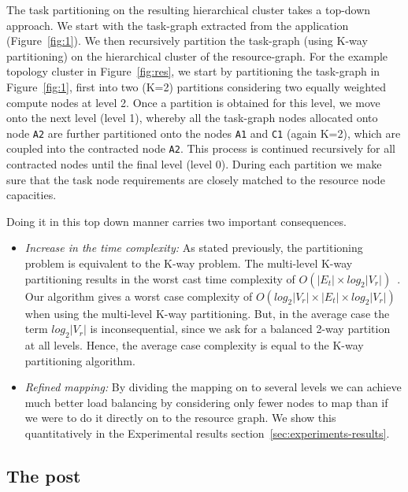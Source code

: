 The task partitioning on the resulting hierarchical cluster takes a
top-down approach. We start with the task-graph extracted from the
application (Figure~\ref{fig:1}). We then recursively partition the
task-graph (using K-way partitioning) on the hierarchical cluster of the
resource-graph. For the example topology cluster in
Figure~\ref{fig:res}, we start by partitioning the task-graph in
Figure~\ref{fig:1}, first into two (K=2) partitions considering two
equally weighted compute nodes at level 2. Once a partition is obtained
for this level, we move onto the next level (level 1), whereby all the
task-graph nodes allocated onto node \texttt{A2} are further partitioned
onto the nodes \texttt{A1} and \texttt{C1} (again K=2), which are
coupled into the contracted node \texttt{A2}. This process is continued
recursively for all contracted nodes until the final level (level
0). During each partition we make sure that the task node requirements
are closely matched to the resource node capacities.


Doing it in this top down manner carries two important consequences.

\begin{itemize}

\item \textit{Increase in the time complexity:} As stated previously,
  the partitioning problem is equivalent to the K-way problem. The
  multi-level K-way partitioning results in the worst cast time
  complexity of $O(|E_t| \times log_2|V_r|)$~\cite{gkar98}. Our
  algorithm gives a worst case complexity of \mbox{$O(log_2|V_r| \times
    |E_t| \times log_2 |V_r|)$} when using the multi-level K-way
  partitioning. But, in the average case the term $log_2|V_r|$ is
  inconsequential, since we ask for a balanced 2-way partition at all
  levels. Hence, the average case complexity is equal to the K-way
  partitioning algorithm.

\item \textit{Refined mapping:} By dividing the mapping on to several
  levels we can achieve much better load balancing by considering only
  fewer nodes to map than if we were to do it directly on to the
  resource graph. We show this quantitatively in the Experimental
  results section~\ref{sec:experiments-results}.

\end{itemize}


\subsection{The post}
\label{sec:post}




